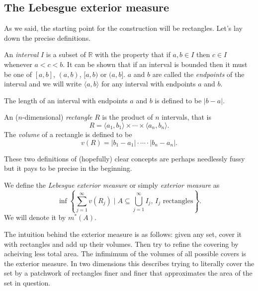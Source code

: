 \documentclass[12pt,oneside]{book}
\numberwithin{table}{section}
\numberwithin{equation}{section}
\numberwithin{figure}{section}
\newcommand{\R}{\mathbb{R}}
\newcommand{\abs}[1]{\lvert #1 \rvert}
\newcommand{\ext}[1]{ m^{*}( #1 ) }
\begin{document}
\subsection{The Lebesgue exterior measure}
As we said, the starting point for the construction will be rectangles. Let's lay down the precise definitions.
\begin{defn}[Interval]
	An \emph{interval} \( I \) is a subset of \( \R \) with the property that if \( a, b \in I \) then \( c \in I \) whenever \( a < c < b \). It can be shown that if an interval is bounded then it must be one of \( [a,b] \), \( (a,b) \), \( [a,b) \) or \( (a,b] \). \( a \) and \( b \) are called the \emph{endpoints} of the interval and we will write \( \langle a,b \rangle \) for any interval with endpoints \( a \) and \( b \).

The length of an interval with endpoints \( a \) and \( b \) is defined to be \( \abs{b - a} \).
\end{defn}

\begin{defn}[Rectangle]
	An (\( n \)-dimensional) \emph{rectangle} \( R \) is the product of \( n \) intervals, that is
	\begin{equation*}
		R = \langle a_1, b_1 \rangle \times \cdots \times \langle a_n, b_n \rangle.
	\end{equation*}
	The \emph{volume} of a rectangle is defined to be
	\begin{equation*}
		v(R) = \abs{b_1 - a_1} \cdot \cdots \cdot \abs{b_n - a_n}.
	\end{equation*}
\end{defn}
These two definitions of (hopefully) clear concepts are perhaps needlessly fussy but it pays to be precise in the beginning.

\begin{defn}
	We define the \emph{Lebesgue exterior measure} or simply \emph{exterior measure} as
	\begin{equation*}
		\inf \left\{ \sum_{j = 1}^{\infty} v(R_j) \mid A \subseteq \bigcup_{j = 1}^{\infty}I_j \text{, }I_j\text{ rectangles} \right\}.
	\end{equation*}
	We will denote it by \( \ext{A} \).
\end{defn}
The intuition behind the exterior measure is as follows: given any set, cover it with rectangles and add up their volumes. Then try to refine the covering by acheiving less total area. The infimimum of the volumes of all possible covers is the exterior measure. In two dimensions this describes trying to literally cover the set by a patchwork of rectangles finer and finer that approximates the area of the set in question.
\end{document}
